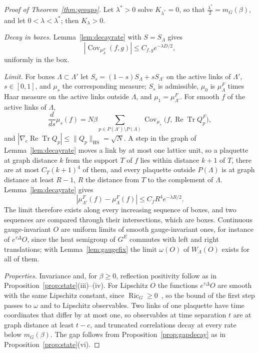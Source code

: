 \documentclass[aps,prd,twocolumn,superscriptaddress,nofootinbib,longbibliography,floatfix,amsmath,amssymb,10pt]{revtex4-2}
\theoremstyle{definition}
\theoremstyle{remark}
\newcommand{\ReTr}{\operatorname{Re}\operatorname{Tr}}
\newcommand{\Ric}{\operatorname{Ric}}
\newcommand{\Cov}{\operatorname{Cov}}
\begin{document}
\begin{proof}[Proof of Theorem~\ref{thm:groups}]
Let $\lambda^*>0$ solve $K_{\lambda^*}=0$, so that $\frac{\lambda^*}2=m_G(\beta)$, and
let $0<\lambda<\lambda^*$; then $K_\lambda>0$.

\emph{Decay in boxes.} Lemma~\ref{lem:decayrate} with $S=S_\Lambda$ gives
\[
|\Cov_{\mu^F_\Lambda}(f,g)|\le C_{f,g}e^{-\lambda D/2},
\]
uniformly in the box.

\emph{Limit.} For boxes $\Lambda\subset\Lambda'$ let $S_s=(1-s)S_\Lambda+sS_{\Lambda'}$
on the active links of $\Lambda'$, $s\in[0,1]$, and $\mu_s$ the corresponding
measure; $S_s$ is admissible, $\mu_0$ is $\mu^F_\Lambda$ times Haar measure on
the active links outside $\Lambda$, and $\mu_1=\mu^F_{\Lambda'}$. For smooth $f$
of the active links of $\Lambda$,
\[
\frac d{ds}\mu_s(f)=N\beta\sum_{p\in P(\Lambda')\setminus P(\Lambda)}
\Cov_{\mu_s}\bigl(f,\ReTr Q^F_p\bigr),
\]
and $|\nabla_e\ReTr Q_p|\le\|Q_p\|_{\mathrm{HS}}=\sqrt N$. A step in the graph
of Lemma~\ref{lem:decayrate} moves a link by at most one lattice unit, so a
plaquette at graph distance $k$ from the support $T$ of $f$ lies within
distance $k+1$ of $T$, there are at most $C_T(k+1)^4$ of them, and every
plaquette outside $P(\Lambda)$ is at graph distance at least $R-1$, $R$ the
distance from $T$ to the complement of $\Lambda$. Lemma~\ref{lem:decayrate}
gives
\[
|\mu^F_{\Lambda'}(f)-\mu^F_\Lambda(f)|\le C_fR^4e^{-\lambda R/2}.
\]
The limit therefore exists along every increasing sequence of boxes, and two
sequences are compared through their intersections, which are boxes.
Continuous gauge-invariant $O$ are uniform limits of smooth gauge-invariant
ones, for instance of $e^{\tau\Delta}O$, since the heat semigroup of $G^E$
commutes with left and right translations; with Lemma~\ref{lem:gaugefix}
the limit $\omega(O)$ of $W_\Lambda(O)$ exists for all of them.

\emph{Properties.} Invariance and, for $\beta\ge0$, reflection positivity
follow as in Proposition~\ref{prop:state}(iii)--(iv). For Lipschitz $O$ the
functions $e^{\tau\Delta}O$ are smooth with the same Lipschitz constant, since
$\Ric_G\ge0$~\cite[Sect.~3.3]{BGL14}, so the bound of the first step
passes to $\omega$ and to Lipschitz observables. Two links of one plaquette
have time coordinates that differ by at most one, so observables at time
separation $t$ are at graph distance at least $t-c$, and truncated
correlations decay at every rate below $m_G(\beta)$. The gap follows
from Proposition~\ref{prop:gapdecay} as in Proposition~\ref{prop:state}(vi).
\end{proof}
\end{document}
